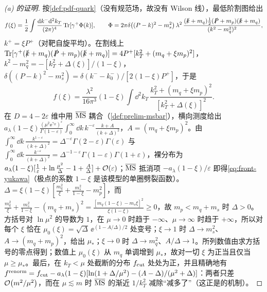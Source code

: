 \begin{proof}[(a) 的证明]
按\cref{def:pdf-quark}（没有规范场，故没有 Wilson 线），最低阶割图给出
\begin{equation*}
f(\xi)=\frac12\int\frac{\mathrm{d} k^-\mathrm{d}^2k_T}{(2\pi)^4}\operatorname{Tr}[\gamma^+\Phi(k)],\qquad
\Phi=2\pi\delta\bigl((P-k)^2-m_s^2\bigr)\,\lambda^2\,\frac{(\slashed{k}+m_q)\frac12(\slashed{P}+m_p)(\slashed{k}+m_q)}{(k^2-m_q^2)^2},
\end{equation*}
$k^+=\xi P^+$（对靶自旋平均）。在割线上 $\operatorname{Tr}[\gamma^+(\slashed{k}+m_q)(\slashed{P}+m_p)(\slashed{k}+m_q)]=4P^+[k_T^2+(m_q+\xi m_p)^2]$，$k^2-m_q^2=-[k_T^2+\Delta(\xi)]/(1-\xi)$，$\delta((P-k)^2-m_s^2)=\delta(k^--k^-_0)/[2(1-\xi)P^+]$，于是
\begin{equation*}
f(\xi)=\frac{\lambda^2}{16\pi^3}(1-\xi)\int\dd^2k_T\,\frac{k_T^2+(m_q+\xi m_p)^2}{[k_T^2+\Delta(\xi)]^2}.
\end{equation*}
在 $D=4-2\varepsilon$ 维中用 $\overline{\mathrm{MS}}$ 耦合（\cref{def:prelim-msbar}），横向测度给出 $a_\lambda(1-\xi)\frac{(\mu^2\ee^{\gamma_E})^\varepsilon}{\Gamma(1-\varepsilon)}\int_0^\infty\dd k\,k^{-\varepsilon}\frac{k+A}{(k+\Delta)^2}$，$A=(m_q+\xi m_p)^2$。由 $\int_0^\infty\dd k\,\frac{k^{1-\varepsilon}}{(k+\Delta)^2}=\Delta^{-\varepsilon}\Gamma(2-\varepsilon)\Gamma(\varepsilon)$ 与 $\int_0^\infty\dd k\,\frac{k^{-\varepsilon}}{(k+\Delta)^2}=\Delta^{-1-\varepsilon}\Gamma(1-\varepsilon)\Gamma(1+\varepsilon)$，裸分布为 $a_\lambda(1-\xi)[\frac1\varepsilon+\ln\frac{\mu^2}{\Delta}-1+\frac A\Delta]+\mathcal{O}\!\left(\varepsilon\right)$；$\overline{\mathrm{MS}}$ 抵消项 $-a_\lambda(1-\xi)/\varepsilon$ 即得\cref{eq:front-yukawa}（极点的系数 $1-\xi$ 是该模型的单圈劈裂函数）。$\Delta=\xi(1-\xi)[\frac{m_q^2}\xi+\frac{m_s^2}{1-\xi}-m_p^2]$，而 $\frac{m_q^2}\xi+\frac{m_s^2}{1-\xi}-(m_q+m_s)^2=\frac{[m_q(1-\xi)-m_s\xi]^2}{\xi(1-\xi)}\ge0$，故 $m_p<m_q+m_s$ 时 $\Delta>0$。方括号对 $\ln\mu^2$ 的导数为 $1$，在 $\mu\to0$ 时趋于 $-\infty$、$\mu\to\infty$ 时趋于 $+\infty$，所以对每个 $\xi$ 恰在 $\mu_0(\xi)=\sqrt{\Delta}\,\ee^{(1-A/\Delta)/2}$ 处变号；$\xi\to1$ 时 $\Delta\to m_s^2$、$A\to(m_q+m_p)^2$，给出 $\mu_*$；$\xi\to0$ 时 $\Delta\to m_q^2$、$A/\Delta\to1$。所列数值由求方括号的零点得到；数值上 $\mu_0(\xi)$ 从 $m_q$ 单调增到 $\mu_*$，故对一切 $\xi$ 为正当且仅当 $\mu\ge\mu_*$。最后，在 $k_T<\mu$ 处截断的分布 $f_{\rm cut}$ 处处为正，并且精确地有 $f^{\rm renorm}=f_{\rm cut}-a_\lambda(1-\xi)[\ln(1+\Delta/\mu^2)-(A-\Delta)/(\mu^2+\Delta)]$：两者只差 $\mathcal{O}\!\left(m^2/\mu^2\right)$，而在 $\mu\lesssim m$ 时 $\overline{\mathrm{MS}}$ 的渐近 $1/k_T^2$ 减除“减多了”（这正是\cite[第~VIII.B~节]{CollinsRogersSato2022}的机制）。
\end{proof}

